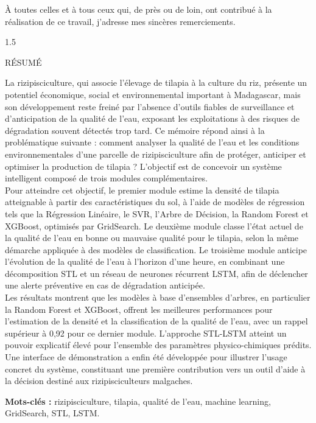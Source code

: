 \documentclass[a4paper,12pt, oneside]{article}
\begin{document}
À toutes celles et à tous ceux qui, de près ou de loin, ont contribué à la réalisation de ce travail, j'adresse mes sincères remerciements.
\vspace*{\fill}
\newpage
\begin{spacing}{1.5}
\begin{center}
\LARGE{RÉSUMÉ}
\end{center}

La rizipisciculture, qui associe l'élevage de tilapia à la culture du riz, présente un potentiel économique, social et environnemental important à Madagascar, mais son développement reste freiné par l'absence d'outils fiables de surveillance et d'anticipation de la qualité de l'eau, exposant les exploitations à des risques de dégradation souvent détectés trop tard. Ce mémoire répond ainsi à la problématique suivante : comment analyser la qualité de l'eau et les conditions environnementales d'une parcelle de rizipisciculture afin de protéger, anticiper et optimiser la production de tilapia ? L'objectif est de concevoir un système intelligent composé de trois modules complémentaires.\\

Pour atteindre cet objectif, le premier module estime la densité de tilapia atteignable à partir des caractéristiques du sol, à l'aide de modèles de régression tels que la Régression Linéaire, le SVR, l'Arbre de Décision, la Random Forest et XGBoost, optimisés par GridSearch. Le deuxième module classe l'état actuel de la qualité de l'eau en bonne ou mauvaise qualité pour le tilapia, selon la même démarche appliquée à des modèles de classification. Le troisième module anticipe l'évolution de la qualité de l'eau à l'horizon d'une heure, en combinant une décomposition STL et un réseau de neurones récurrent LSTM, afin de déclencher une alerte préventive en cas de dégradation anticipée.\\

Les résultats montrent que les modèles à base d'ensembles d'arbres, en particulier la Random Forest et XGBoost, offrent les meilleures performances pour l'estimation de la densité et la classification de la qualité de l'eau, avec un rappel supérieur à 0,92 pour ce dernier module. L'approche STL-LSTM atteint un pouvoir explicatif élevé pour l'ensemble des paramètres physico-chimiques prédits. Une interface de démonstration a enfin été développée pour illustrer l'usage concret du système, constituant une première contribution vers un outil d'aide à la décision destiné aux rizipisciculteurs malgaches.

\vspace{0.5cm}
\textbf{Mots-clés :} rizipisciculture, tilapia, qualité de l'eau, machine learning, GridSearch, STL, LSTM.
\end{spacing}
\end{document}
